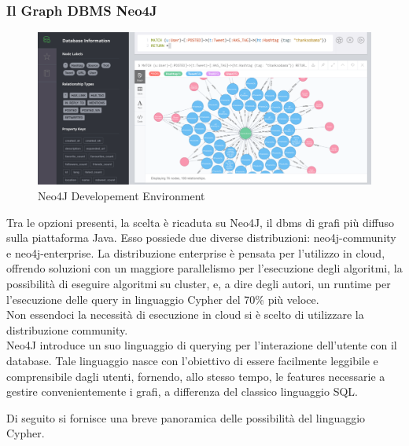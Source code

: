 \documentclass[a4paper, 12pt]{article}
\begin{document}
\subsubsection{Il Graph DBMS Neo4J}
\begin{figure}[h!]
  \includegraphics[width=\linewidth]{images/neo4j.png}
  \caption{Neo4J Developement Environment}
\end{figure}
Tra le opzioni presenti, la scelta è ricaduta su Neo4J, il dbms di grafi più diffuso sulla piattaforma Java. Esso possiede due diverse distribuzioni: neo4j-community e neo4j-enterprise. La distribuzione enterprise è pensata per l'utilizzo in cloud, offrendo soluzioni con un maggiore parallelismo per l'esecuzione degli algoritmi, la possibilità di eseguire algoritmi su cluster, e, a dire degli autori, un runtime per l'esecuzione delle query in linguaggio Cypher del 70\% più veloce. \\
Non essendoci la necessità di esecuzione in cloud si è scelto di utilizzare la distribuzione community. \\
Neo4J introduce un suo linguaggio di querying per l'interazione dell'utente con il database. Tale linguaggio nasce con l'obiettivo di essere facilmente leggibile e comprensibile dagli utenti, fornendo, allo stesso tempo, le features necessarie a gestire convenientemente i grafi, a differenza del classico linguaggio SQL.
\par
Di seguito si fornisce una breve panoramica delle possibilità del linguaggio Cypher.
\end{document}
